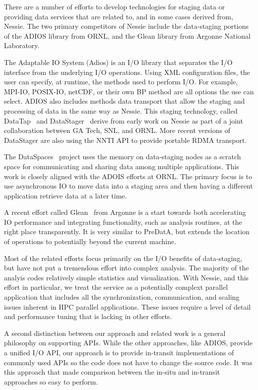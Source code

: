 There are a number of efforts to develop technologies for staging data or 
providing data services that are related to, and in some cases derived from,
Nessie.  The two primary competitors of Nessie include the data-staging
portions of the ADIOS library from ORNL, and the Glean library from Argonne
National Laboratory. 

The Adaptable IO System (Adios) is an I/O library that separates the I/O
interface from the underlying I/O operations.  Using XML configuration 
files, the user can specify, at runtime, the methods used to perform I/O.
For example, MPI-IO, POSIX-IO, netCDF, or their own BP method are all options
the use can select.  ADIOS also includes methods data transport that allow
the staging and processing of data in the same way as Nessie.  This staging
technology, called DataTap~\cite{datatap2009cluster} and
DataStager~\cite{abbasi:2010:datastager} derive from early work on Nessie as
part of a joint collaboration between GA Tech, SNL, and ORNL.  More recent
versions of DataStager are also using the NNTI API to provide portable 
RDMA transport. 

The DataSpaces~\cite{docan:2010:dataspaces} project uses the memory on
data-staging nodes as a scratch space for communicating and sharing 
data among multiple applications.  This work is closely aligned with the 
ADOIS efforts at ORNL.  The primary focus is to use asynchronous IO to
move data into a staging area and then having a
different application retrieve data at a later time.

A recent effort called Glean~\cite{vishwanath:2011:glean} from Argonne is a
start towards both accelerating IO performance and integrating functionality,
such as analysis routines, at the right place transparently. It is very similar
to PreDatA, but extends the location of operations to potentially beyond the
current machine.

Most of the related efforts focus primarily on the I/O benefits of data-staging, but
have not put a tremendous effort into complex analysis. The majority of the analyis
codes relatively simple statistics and visualization.  With Nessie, and 
this effort in particular, we treat the service as a potentially complext parallel application
that includes all the synchronization, communication, and scaling issues inherent in HPC 
parallel applications.  These issues require a level of detail and performance 
tuning that is lacking in other efforts.  

A second distinction between our approach and related work is a general 
philosophy on supporting APIs.  While the other approaches, like ADIOS,
provide a unified I/O API, our approach is to provide in-transit
implementations of commonly used APIs so the code does not have to change the
source code.  It was this approach that made comparison between the in-situ and
in-transit approaches so easy to perform.

